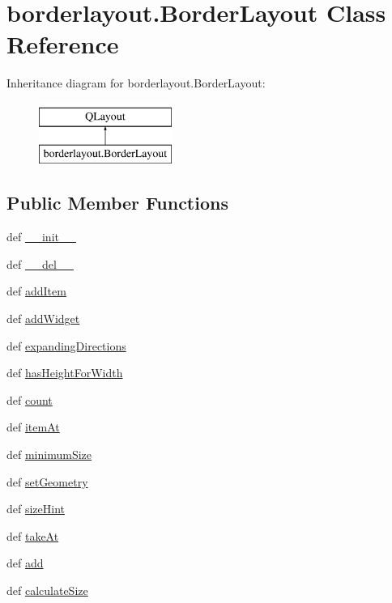 \hypertarget{classborderlayout_1_1BorderLayout}{}\section{borderlayout.\+Border\+Layout Class Reference}
\label{classborderlayout_1_1BorderLayout}
Inheritance diagram for borderlayout.\+Border\+Layout\+:\begin{figure}[H]
\begin{center}
\leavevmode
\includegraphics[height=2.000000cm]{classborderlayout_1_1BorderLayout}
\end{center}
\end{figure}
\subsection*{Public Member Functions}
\begin{DoxyCompactItemize}
\item 
def \hyperlink{classborderlayout_1_1BorderLayout_a3cb592ca7ce5435577d0ca929b458f62}{\+\_\+\+\_\+init\+\_\+\+\_\+}
\item 
def \hyperlink{classborderlayout_1_1BorderLayout_adf58f678efd7ce828a15324d68201727}{\+\_\+\+\_\+del\+\_\+\+\_\+}
\item 
def \hyperlink{classborderlayout_1_1BorderLayout_a9cfdf60973020f21943bac5b9f692647}{add\+Item}
\item 
def \hyperlink{classborderlayout_1_1BorderLayout_a857b716354296d24b1855f74df00cea6}{add\+Widget}
\item 
def \hyperlink{classborderlayout_1_1BorderLayout_aea9259fae4cfe3dd140b5606d8cba492}{expanding\+Directions}
\item 
def \hyperlink{classborderlayout_1_1BorderLayout_a110c5dae295b18347c0c7d8a266be3ce}{has\+Height\+For\+Width}
\item 
def \hyperlink{classborderlayout_1_1BorderLayout_a2b3a684d88c051a32d70e345cbf1197c}{count}
\item 
def \hyperlink{classborderlayout_1_1BorderLayout_a2d64d499e1afe2108156aa94f8054962}{item\+At}
\item 
def \hyperlink{classborderlayout_1_1BorderLayout_ab8cd45afc5fb677cd032f4ae2dd78943}{minimum\+Size}
\item 
def \hyperlink{classborderlayout_1_1BorderLayout_aedf482aeb93046df201ecaf9c477bca6}{set\+Geometry}
\item 
def \hyperlink{classborderlayout_1_1BorderLayout_a24f868289889c91c0e931a3349a899c7}{size\+Hint}
\item 
def \hyperlink{classborderlayout_1_1BorderLayout_af8787caadbe6969b84ffa441904fe0ac}{take\+At}
\item 
def \hyperlink{classborderlayout_1_1BorderLayout_a60fc5cd2fbe8266457471652c5995b80}{add}
\item 
def \hyperlink{classborderlayout_1_1BorderLayout_a136537265ffaa144b490b2a352db03d7}{calculate\+Size}
\end{DoxyCompactItemize}
